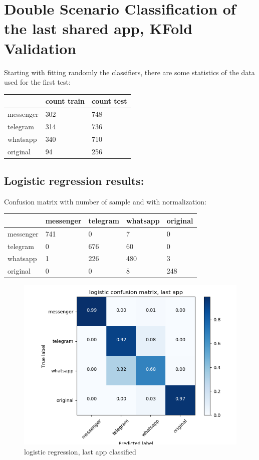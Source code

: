 \chapter{Double Scenario Classification of the last shared app, KFold Validation}Starting with fitting randomly the classifiers, there are some statistics of the data used for the first test: \\
 {\def\arraystretch{1.3} 
 \begin{table}[H] 
\centering 
\begin{tabular}{|l|l|l|} 
\hline 
  &count train  &count test  \\ \hline
messenger  &302  &748  \\ \hline
telegram  &314  &736  \\ \hline
whatsapp  &340  &710  \\ \hline
original  &94  &256  \\ \hline
\end{tabular} 
\end{table} }
\section{Logistic regression results:} 
Confusion matrix with number of sample and with normalization:
 {\def\arraystretch{1.3} 
 \begin{table}[H] 
\centering 
\begin{tabular}{|l|l|l|l|l|} 
\hline 
  &messenger  &telegram  &whatsapp  &original  \\ \hline
messenger  &741  &0  &7  &0  \\ \hline
telegram  &0  &676  &60  &0  \\ \hline
whatsapp  &1  &226  &480  &3  \\ \hline
original  &0  &0  &8  &248  \\ \hline
\end{tabular} 
\end{table} }

 \begin{figure}[H] 
\centering 
\includegraphics[scale=.6]{images/lr_initial_double_simple.png} 
\caption{logistic regression, last app classified} 
\end{figure} 


